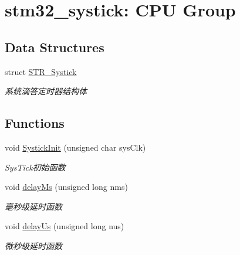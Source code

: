 \hypertarget{group___s_y_s_t_i_c_k}{\section{stm32\-\_\-systick\-: \-C\-P\-U \-Group}
\label{group___s_y_s_t_i_c_k}
}
\subsection*{\-Data \-Structures}
\begin{DoxyCompactItemize}
\item 
struct \hyperlink{struct_s_t_r___systick}{\-S\-T\-R\-\_\-\-Systick}
\begin{DoxyCompactList}\small\item\em 系统滴答定时器结构体 \end{DoxyCompactList}\end{DoxyCompactItemize}
\subsection*{\-Functions}
\begin{DoxyCompactItemize}
\item 
void \hyperlink{group___s_y_s_t_i_c_k_ga6a4dda3916b88b3f9865a6139918cd51}{\-Systick\-Init} (unsigned char sys\-Clk)
\begin{DoxyCompactList}\small\item\em \-Sys\-Tick初始函数 \end{DoxyCompactList}\item 
void \hyperlink{group___s_y_s_t_i_c_k_ga123f135e69ea11715b56e407cd33cde1}{delay\-Ms} (unsigned long nms)
\begin{DoxyCompactList}\small\item\em 毫秒级延时函数 \end{DoxyCompactList}\item 
void \hyperlink{group___s_y_s_t_i_c_k_ga4a8afb6879fabf019480205f103a09e2}{delay\-Us} (unsigned long nus)
\begin{DoxyCompactList}\small\item\em 微秒级延时函数 \end{DoxyCompactList}\end{DoxyCompactItemize}
